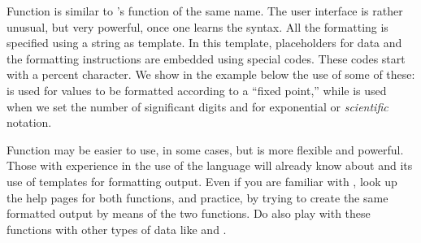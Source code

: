 \documentclass[krantz2]{krantz}\usepackage{knitr}
\begin{document}
Function  is similar to \Clang's function of the same name. The user interface is rather unusual, but very powerful, once one learns the syntax. All the formatting is specified using a  string as template. In this template, placeholders for data and the formatting instructions are embedded using special codes. These codes start with a percent character. We show in the example below the use of some of these:  is used for  values to be formatted according to a ``fixed point,'' while  is used when we set the number of significant digits and  for exponential or \emph{scientific} notation.

\begin{knitrout}\footnotesize
{}\color{fgcolor}
\end{knitrout}

\begin{playground}
Function  may be easier to use, in some cases, but  is more flexible and powerful. Those with experience in the use of the \Clang language will already know about  and its use of templates for formatting output. Even if you are familiar with  \Clang, look up the help pages for both functions, and practice, by trying to create the same formatted output by means of the two functions. Do also play with these functions with other types of data like  and .
\end{playground}
\end{document}
